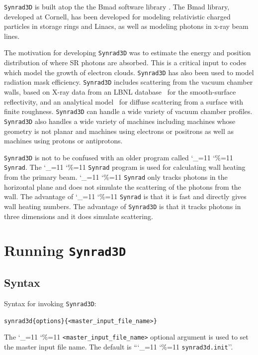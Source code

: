 \documentclass[11pt,openany]{report}
\newcommand{\srthree}{\texttt{Synrad3D}\xspace}
\newcommand\ttcmd{\begingroup\catcode`\_=11 \catcode`\%=11 \dottcmd}
\newcommand\dottcmd[1]{\texttt{#1}\endgroup}
\newcommand{\vn}{\ttcmd}
\newlength{\ExBeg}
\newlength{\ExEnd}
\newenvironment{example}
  {\vspace{\ExBeg} \begin{alltt}}
  {\end{alltt} \vspace{\ExEnd}}
\begin{document}
\srthree is built atop the the Bmad software library
\cite{b:bmad}. The Bmad library, developed at Cornell, has been
developed for modeling relativistic charged particles in storage rings
and Linacs, as well as modeling photons in x-ray beam lines.

The motivation for developing \srthree was to estimate the energy and
position distribution of where SR photons are absorbed. This is a
critical input to codes which model the growth of electron clouds.
\srthree has also been used to model radiation mask efficiency.
\srthree includes scattering from the vacuum chamber walls, based on
X-ray data from an LBNL database~\cite{b:henke} for the smooth-surface
reflectivity, and an analytical model~\cite{b:beckmann,b:ogilvy} for
diffuse scattering from a surface with finite roughness. \srthree can
handle a wide variety of vacuum chamber profiles. \srthree also
handles a wide variety of machines including machines whose geometry
is not planar and machines using electrons or positrons as well as
machines using protons or antiprotons.

\srthree is not to be confused with an older program called
\vn{Synrad}. The \vn{Synrad} program is used for calculating wall
heating from the primary beam. \vn{Synrad} only tracks photons in the
horizontal plane and does not simulate the scattering of the photons
from the wall. The advantage of \vn{Synrad} is that it is fast and
directly gives wall heating numbers. The advantage of \srthree is that
it tracks photons in three dimensions and it does simulate scattering.

\chapter{Running \srthree} 
\label{s:run}

\section{Syntax}
\label{s:syntax}

Syntax for invoking \srthree:
\begin{example}
  synrad3d \{options\} \{<master_input_file_name>\}
\end{example}

The \vn{<master_input_file_name>} optional argument is used to set the
master input file name. The default is ``\vn{synrad3d.init}''. 
\end{document}

